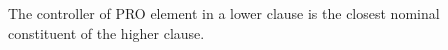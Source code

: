     \begin{generalization}\label{gen:11}
    	The controller of PRO element in a lower clause is the closest nominal constituent of the higher clause.
    \end{generalization}

